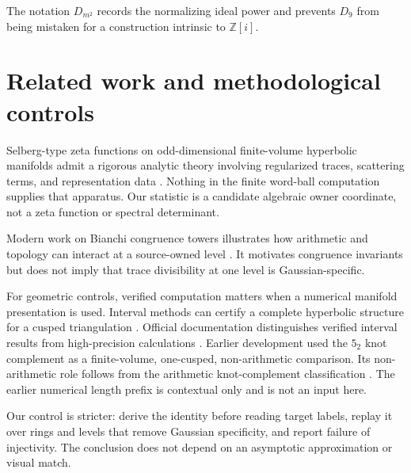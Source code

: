 \documentclass[11pt,a4paper]{article}
\theoremstyle{definition}
\theoremstyle{remark}
\newcommand{\Gauss}{\mathbb{Z}[i]}
\begin{document}
The notation \(D_{m^2}\) records the normalizing ideal power and prevents \(D_9\) from being mistaken for a construction intrinsic to \(\Gauss\).

\section{Related work and methodological controls}

Selberg-type zeta functions on odd-dimensional finite-volume hyperbolic manifolds admit a rigorous analytic theory involving regularized traces, scattering terms, and representation data \citep[abstract and Secs.~3--5]{Pfaff2015}. Nothing in the finite word-ball computation supplies that apparatus. Our statistic is a candidate algebraic owner coordinate, not a zeta function or spectral determinant.

Modern work on Bianchi congruence towers illustrates how arithmetic and topology can interact at a source-owned level \citep[Introduction and Sec.~2]{PfaffRaimbault2020}. It motivates congruence invariants but does not imply that trace divisibility at one level is Gaussian-specific.

For geometric controls, verified computation matters when a numerical manifold presentation is used.
Interval methods can certify a complete hyperbolic structure for a cusped triangulation \citep[Thm.~5.1 and Secs.~3--5]{HIKMOT2016}.
Official documentation distinguishes verified interval results from high-precision calculations \citep[verified computations and \texttt{verify\_hyperbolicity}]{SnapPyDocs2026}.
Earlier development used the \(5_2\) knot complement as a finite-volume, one-cusped, non-arithmetic comparison.
Its non-arithmetic role follows from the arithmetic knot-complement classification \citep[main theorem]{Reid1991}. The earlier numerical length prefix is contextual only and is not an input here.

Our control is stricter: derive the identity before reading target labels, replay it over rings and levels that remove Gaussian specificity, and report failure of injectivity. The conclusion does not depend on an asymptotic approximation or visual match.
\end{document}
